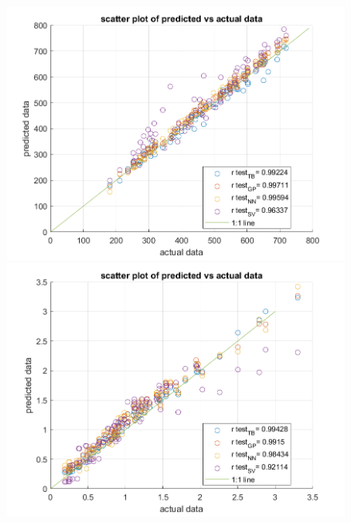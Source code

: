 \documentclass[12pt]{iopart}
\begin{document}
\begin{figure}[ht!]
\begin{center}
\begin{minipage}{0.495\textwidth}
    \includegraphics[width=1\textwidth]{volt1_12T.png}
\end{minipage}
\begin{minipage}{0.495\textwidth}
    \includegraphics[width=1\textwidth]{current1_12T.png}
\end{minipage}
\begin{minipage}{0.495\textwidth}

\end{minipage}
\end{center}
\end{figure}
\end{document}
